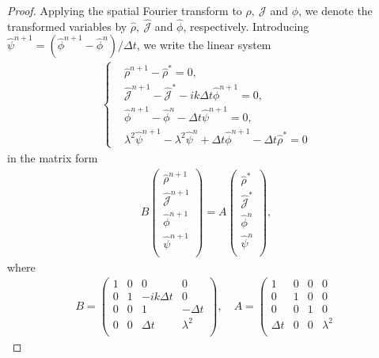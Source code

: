 \documentclass[letterpaper,10pt]{article}
\numberwithin{equation}{section}
\numberwithin{figure}{section}
\numberwithin{table}{section}
\begin{document}
\begin{proof}
Applying the spatial Fourier transform to $\rho,~\mathcal{J}$ and $\phi$, we denote the transformed variables by $\hat\rho,~\hat{\mathcal{J}}$ and $\hat\phi$, respectively. Introducing $\hat\psi^{n+1}=(\hat\phi^{n+1}-\hat\phi^n)/\Delta t$, we write
the linear system
\begin{align}
    \left\{
        \begin{aligned}
            &\hat\rho^{n+1}-\hat\rho^*=0,\\
            &\hat {\mathcal{J}}^{n+1}-\hat{\mathcal{J}}^*-ik\Delta t\hat\phi^{n+1}=0,\\
            &\hat\phi^{n+1}-\hat\phi^n-\Delta t\hat\psi^{n+1}=0,\\
            &\lambda^2\hat\psi^{n+1}-\lambda^2\hat\psi^n+\Delta t\hat\phi^{n+1}-\Delta t\hat\rho^*=0
        \end{aligned}
    \right.
\end{align}
in the matrix form
\begin{align}
B
    \left(
    \begin{array}{cccc}
    \hat\rho^{n+1}  \\
    \hat {\mathcal{J}}^{n+1}  \\
    \hat\phi^{n+1}   \\
    \hat\psi^{n+1}  \\
    \end{array}
\right)=A
    \left(
    \begin{array}{cccc}
    \hat\rho^*  \\
    \hat {\mathcal{J}}^*  \\
    \hat\phi^n  \\
    \hat\psi^n  \\
    \end{array}
\right),
\end{align}
where
\begin{align*}
B=\left(
\begin{array}{cccc}
    1 & 0 & 0 & 0 \\
    0 & 1 & -ik\Delta t & 0 \\
    0 & 0 & 1 & -\Delta t \\
    0 & 0 & \Delta t & \lambda^2 \\
\end{array}
\right),\quad A=\left(
\begin{array}{cccc}
    1 & 0 & 0 & 0 \\
    0 & 1 & 0 & 0 \\
    0 & 0 & 1 & 0 \\
    \Delta t & 0 & 0 & \lambda^2 \\

\end{array}
\end{align*}
\end{proof}
\end{document}
